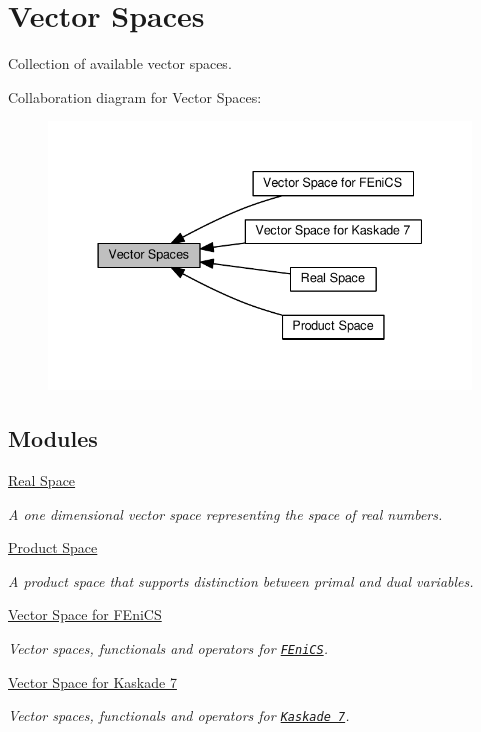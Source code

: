 \hypertarget{group__VectorSpaceGroup}{}\section{Vector Spaces}
\label{group__VectorSpaceGroup}


Collection of available vector spaces.  


Collaboration diagram for Vector Spaces\+:\nopagebreak
\begin{figure}[H]
\begin{center}
\leavevmode
\includegraphics[width=337pt]{group__VectorSpaceGroup}
\end{center}
\end{figure}
\subsection*{Modules}
\begin{DoxyCompactItemize}
\item 
\hyperlink{group__RealGroup}{Real Space}
\begin{DoxyCompactList}\small\item\em A one dimensional vector space representing the space of real numbers. \end{DoxyCompactList}\item 
\hyperlink{group__ProductSpaceGroup}{Product Space}
\begin{DoxyCompactList}\small\item\em A product space that supports distinction between primal and dual variables. \end{DoxyCompactList}\item 
\hyperlink{group__FenicsGroup}{Vector Space for F\+Eni\+C\+S}
\begin{DoxyCompactList}\small\item\em Vector spaces, functionals and operators for \href{http://www.fenicsproject.org}{\tt F\+Eni\+C\+S}. \end{DoxyCompactList}\item 
\hyperlink{group__KaskadeGroup}{Vector Space for Kaskade 7}
\begin{DoxyCompactList}\small\item\em Vector spaces, functionals and operators for \href{http://www.zib.de/projects/kaskade7-finite-element-toolbox}{\tt Kaskade 7}. \end{DoxyCompactList}\end{DoxyCompactItemize}


